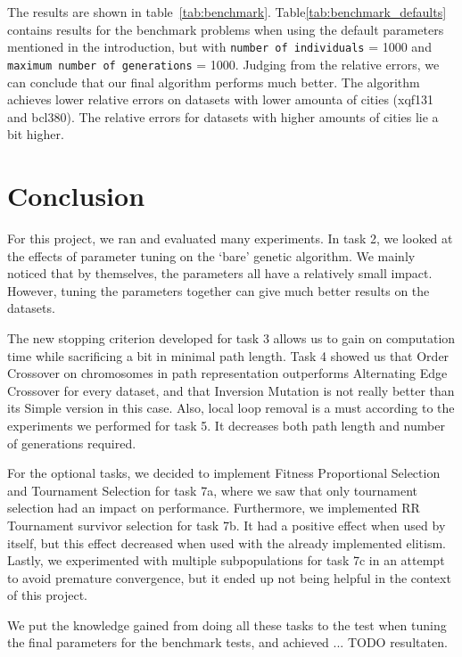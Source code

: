 \documentclass{report}
\begin{document}
The results are shown in table~\ref{tab:benchmark}. Table\ref{tab:benchmark_defaults} contains results for the benchmark problems when using the default parameters mentioned in the introduction, but with \texttt{number of individuals} = 1000 and \texttt{maximum number of generations} = 1000. Judging from the relative errors, we can conclude that our final algorithm performs much better. The algorithm achieves lower relative errors on datasets with lower amounta of cities (xqf131 and bcl380). The relative errors for datasets with higher amounts of cities lie a bit higher.



\newpage
\section{Conclusion}

For this project, we ran and evaluated many experiments. In task 2, we looked at the effects of parameter tuning on the `bare' genetic algorithm. We mainly noticed that by themselves, the parameters all have a relatively small impact. However, tuning the parameters together can give much better results on the datasets.

The new stopping criterion developed for task 3 allows us to gain on computation time while sacrificing a bit in minimal path length. Task 4 showed us that Order Crossover on chromosomes in path representation outperforms Alternating Edge Crossover for every dataset, and that Inversion Mutation is not really better than its Simple version in this case. Also, local loop removal is a must according to the experiments we performed for task 5. It decreases both path length and number of generations required.

For the optional tasks, we decided to implement Fitness Proportional Selection and Tournament Selection for task 7a, where we saw that only tournament selection had an impact on performance. Furthermore, we implemented RR Tournament survivor selection for task 7b. It had a positive effect when used by itself, but this effect decreased when used with the already implemented elitism. Lastly, we experimented with multiple subpopulations for task 7c in an attempt to avoid premature convergence, but it ended up not being helpful in the context of this project.

We put the knowledge gained from doing all these tasks to the test when tuning the final parameters for the benchmark tests, and achieved ... TODO resultaten.
\end{document}
